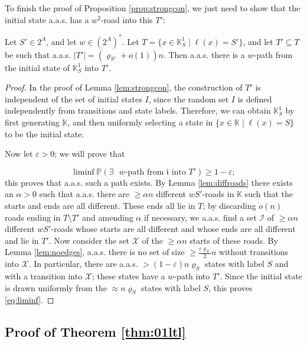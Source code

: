 \documentclass[runngingheads]{llncs}
\newcommand{\ini}{\mathfrak{i}}
\begin{document}
To finish the proof of Proposition \ref{prop:strongcon}, we just need to show that the initial state a.a.s. has a $w^2$-road into this $T'$:

\begin{lemma}
Let $S' \in 2^A$, and let $w \in (2^A)^*$. Let $T = \{x \in \mathbb{K}^1_S \mid \ell(x) = S'\}$, and let $T' \subseteq T$ be such that a.a.s. $|T'| = (\varrho_{S'}+o(1))n$. Then a.a.s. there is a $w$-path from the initial state of $\mathbb{K}^1_S$ into $T'$.
\end{lemma}

\begin{proof}
In the proof of Lemma \ref{lem:strongcon}, the construction of $T'$ is independent of the set of initial states $I$, since the random set $I$ is defined independently from transitions and state labels. Therefore, we can obtain $\mathbb{K}^1_S$ by first generating $\mathbb{K}$, and then uniformly selecting a state in $\{x \in \mathbb{K} \mid \ell(x) = S\}$ to be the initial state. 

Now let $\varepsilon > 0$; we will prove that 

\begin{equation} \label{eq:liminf}
\liminf \mathbb{P}(\exists \textrm{ $w$-path from $\ini$ into $T'$}) \geq 1-\varepsilon;
\end{equation}
this proves that a.a.s. such a path exists. By Lemma \ref{lem:diffroads} there exists an $\alpha > 0$ such that a.a.s. there are $\geq \alpha n$ different $wS'$-roads in $\mathbb{K}$ such that the starts and ends are all different. These ends all lie in $T$; by discarding $o(n)$ roads ending in $T \setminus T'$ and amending $\alpha$ if necessary, we a.a.s. find a set $\mathcal{I}$ of $\geq \alpha n$ different $wS'$-roads whose starts are all different and whose ends are all different and lie in $T'$. Now consider the set $\mathcal{X}$ of the $\geq \alpha n$ starts of these roads. By Lemma \ref{lem:noedges}, a.a.s. there is no set of size $\geq \frac{\varepsilon \varrho_S}{2} n$ without transitions into $\mathcal{X}$. In particular, there are a.a.s. $> (1-\varepsilon)n\varrho_S$ states with label $S$ and with a transition into $\mathcal{X}$; these states have a $w$-path into $T'$. Since the initial state is drawn uniformly from the $\approx n\varrho_{S}$ states with label $S$, this proves \eqref{eq:liminf}.
\end{proof}

\subsection{Proof of Theorem \ref{thm:01ltl}}
\end{document}
